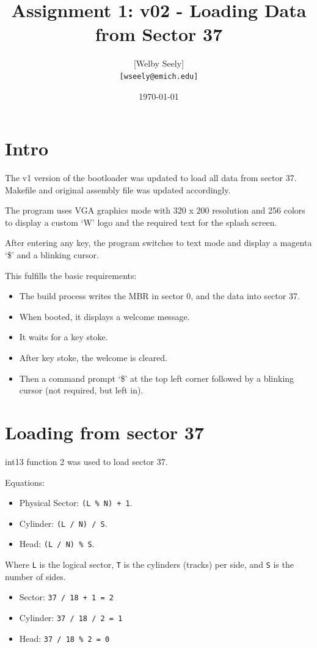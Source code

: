 \documentclass{article}
\title{Assignment 1: v02 - Loading Data from Sector 37}
\author{
    [Welby Seely] \\
    \texttt{[wseely@emich.edu]}
}
\date{\today}
\begin{document}
    \maketitle
    \section{Intro}\label{sec:intro}
    The v1 version of the bootloader was updated to load all data from sector 37.
    Makefile and original assembly file was updated accordingly.

    The program uses VGA graphics mode with 320 x 200 resolution and 256 colors to display a
    custom `W' logo and the required text for the splash screen.

    After entering any key, the program switches to text mode and display a magenta `\$' and a
    blinking cursor.

    This fulfills the basic requirements:

    \begin{itemize}
        \item The build process writes the MBR in sector 0, and the data into sector 37.
        \item When booted, it displays a welcome message.
        \item It waits for a key stoke.
        \item After key stoke, the welcome is cleared.
        \item Then a command prompt `\$' at the top left corner followed by a blinking cursor (not required, but left in).
    \end{itemize}

    \section{Loading from sector 37}\label{sec:reqs}
    int13 function 2 was used to load sector 37.

    Equations:
    \begin{itemize}
        \item Physical Sector: \verb|(L % N) + 1|.
        \item Cylinder: \verb|(L / N) / S|.
        \item Head: \verb|(L / N) % S|.
    \end{itemize}
    Where \verb|L| is the logical sector, \verb|T| is the cylinders (tracks) per side, and \verb|S| is the number of sides.

    \begin{itemize}
        \item Sector: \verb|37 / 18 + 1 = 2|
        \item Cylinder: \verb|37 / 18 / 2 = 1|
        \item Head: \verb|37 / 18 % 2 = 0|
    \end{itemize}
\end{document}
